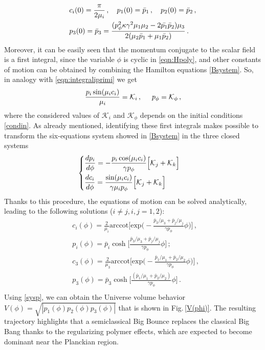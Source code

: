 \documentclass[aps,prd,twocolumn,nofootinbib,superscriptaddress]{revtex4-2}
\begin{document}
\begin{equation}
	\label{condin}
	\begin{aligned}
	&c_i(0)={\pi\over 2 \mu_i}\,,\quad p_1(0)=\bar{p}_1\,,\quad p_2(0)=\bar{p}_2\,,\\
	&p_3(0)=\bar{p}_3=\frac{(p_\phi^2\kappa\gamma^2\mu_1\mu_2-2\bar{p_1}\bar{p}_2)\mu_3}{2(\mu_2\bar{p}_1+\mu_1\bar{p}_2)}\,.
	\end{aligned}
\end{equation}
Moreover, it can be easily seen that the momentum conjugate to the scalar field is a first integral, since the variable $\phi$ is cyclic in \eqref{eqn:Hpoly}, and other constants of motion can be obtained by combining the Hamilton equations \eqref{Bsystem}. So, in analogy with \eqref{eqn:integraliprimi}
we get
\begin{equation}
	{p_{i}\sin(\mu_i c_i)\over{\mu_i}}=\mathcal{K}_{i}\,,\hspace{0.5cm}p_{\phi}=\mathcal{K}_{\phi}\,,
\end{equation}
where the considered values of $\mathcal{K}_{i}$ and $\mathcal{K}_{\phi}$ depends on the initial conditions \eqref{condin}. As already mentioned, identifying these first integrals makes possible to transform the six-equations system showed in \eqref{Bsystem} in the three closed systems 
\begin{equation}
\label{Bsystemdecoupled}
\begin{cases}
\begin{aligned}
	\small &{{dp_i}\over{d\phi}}=-{{p_i\cos(\mu_i c_i)}\over\gamma p_{\phi}}\Big[\mathcal{K}_j+\mathcal{K}_k\Big]\\
	\small &{{dc_i}\over{d\phi}}={\sin(\mu_i c_i)\over{\gamma\mu_i p_{\phi}}}\Big[\mathcal{K}_j+\mathcal{K}_k\Big]
\end{aligned}
\end{cases}
\end{equation}
Thanks to this procedure, the equations of motion can be solved analytically, leading to the following solutions ($i\neq j, i,j=1,2$):
\begin{equation}
	\label{sysp}
	\begin{aligned}
		&c_i(\phi)=\frac{2}{\mu_i}\text{arccot}\big[\text{exp}\big(-\frac{\bar{p}_3/\mu_3+\bar{p}_j/\mu_j}{\gamma p_\phi}\phi\big)\big]\,,\\ 
		&p_i(\phi)=\bar{p}_i\cosh\Big[\frac{\bar{p}_3/\mu_3+\bar{p}_j/\mu_j}{\gamma p_\phi}\phi\Big]\,;\\
		&c_3(\phi)=\frac{2}{\mu_3}\text{arccot}\big[\text{exp}\big(-\frac{\bar{p}_1/\mu_1+\bar{p}_2/\mu_2}{\gamma p_\phi}\phi\big)\big]\,,\\
		&p_3(\phi)=\bar{p}_3\cosh\Big[\frac{(\bar{p}_1/\mu_1+\bar{p}_2/\mu_2)}{\gamma p_\phi}\phi\Big]\,.\\
	\end{aligned}
\end{equation}
Using \eqref{sysp}, we can obtain the Universe volume behavior $V(	\phi)=\sqrt{|p_1(\phi)p_2(\phi)p_3(\phi)|}$ that is shown in Fig.$\,$\ref{V(phi)}. The resulting trajectory highlights that a semiclassical Big Bounce replaces the classical Big Bang thanks to the regularizing polymer effects, which are expected to become dominant near the Planckian region.
\end{document}
